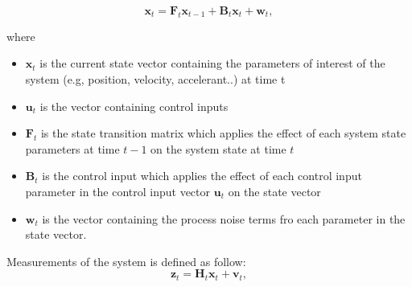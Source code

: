 \begin{equation}
    \textbf{x}_t = \textbf{F}_t \textbf{x}_{t-1} + \textbf{B}_t \textbf{x}_t + \textbf{w}_t,
   \end{equation}\par
   where
   \begin{itemize}
       \item $\textbf{x}_t$ is the current state vector containing the parameters of interest of the system (e.g, position, velocity, accelerant..) at time t
       \item $\textbf{u}_t$ is the vector containing control inputs
       \item $\textbf{F}_t$ is the state transition matrix which applies the effect of each system state parameters at time $t-1$ on the system state at time $t$
       \item $\textbf{B}_t$ is the control input which applies the effect of each control input parameter in the control input vector $\textbf{u}_t$ on the state vector
       \item $\textbf{w}_t$ is the vector containing the process noise terms fro each parameter in the state vector.
   \end{itemize}
   
   \hspace{0.5cm}Measurements of the system is defined as follow:
   \begin{equation}
            \textbf{z}_t = \textbf{H}_t\textbf{x}_t + \textbf{v}_t,
   \end{equation}
   
